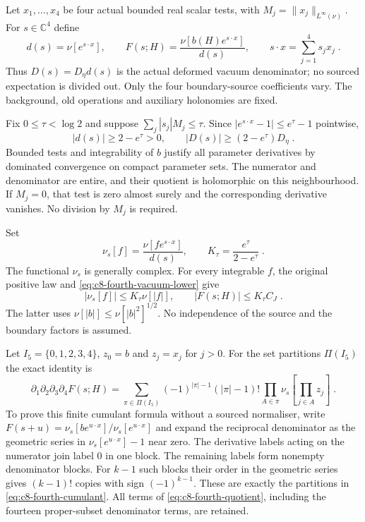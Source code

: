 \documentclass[11pt]{article}
\begin{document}
Let $x_1,\ldots,x_4$ be four actual bounded real scalar tests, with
$M_j=\|x_j\|_{L^\infty(\nu)}$. For $s\in\mathbb C^4$ define
\begin{equation}\label{eq:c8-fourth-tilt}
    d(s)=\nu[e^{s\cdot x}],\qquad
    F(s;H)=\frac{\nu[b(H)e^{s\cdot x}]}{d(s)},\qquad
    s\cdot x=\sum_{j=1}^{4}s_jx_j\;.
\end{equation}
Thus $D(s)=D_\eta d(s)$ is the actual deformed vacuum denominator;
no sourced expectation is divided out. Only the four boundary-source
coefficients vary. The background, old operations and auxiliary
holonomies are fixed.

Fix $0\leq\tau<\log2$ and suppose $\sum_j|s_j|M_j\leq\tau$.
Since $|e^{s\cdot x}-1|\leq e^\tau-1$ pointwise,
\begin{equation}\label{eq:c8-fourth-vacuum-lower}
    |d(s)|\geq2-e^\tau>0,\qquad
    |D(s)|\geq(2-e^\tau)D_\eta\;.
\end{equation}
Bounded tests and integrability of $b$ justify all parameter derivatives
by dominated convergence on compact parameter sets. The numerator and
denominator are entire, and their quotient is holomorphic on this
neighbourhood. If $M_j=0$, that test is zero almost surely and the
corresponding derivative vanishes. No division by $M_j$ is required.

Set
\begin{equation}\label{eq:c8-fourth-tilted-functional}
    \nu_s[f]=\frac{\nu[fe^{s\cdot x}]}{d(s)},\qquad
    K_\tau=\frac{e^\tau}{2-e^\tau}\;.
\end{equation}
The functional $\nu_s$ is generally complex. For every integrable $f$,
the original positive law and \eqref{eq:c8-fourth-vacuum-lower} give
\begin{equation}\label{eq:c8-fourth-tilt-domination}
    |\nu_s[f]|\leq K_\tau\nu[|f|],\qquad
    |F(s;H)|\leq K_\tau C_J\;.
\end{equation}
The latter uses $\nu[|b|]\leq\nu[|b|^2]^{1/2}$. No independence
of the source and the boundary factors is assumed.

Let $I_5=\{0,1,2,3,4\}$, $z_0=b$ and $z_j=x_j$ for $j>0$.
For the set partitions $\Pi(I_5)$ the exact identity is
\begin{equation}\label{eq:c8-fourth-cumulant}
    \partial_1\partial_2\partial_3\partial_4F(s;H)
        =\sum_{\pi\in\Pi(I_5)}(-1)^{|\pi|-1}(|\pi|-1)!
            \prod_{A\in\pi}\nu_s\left[\prod_{j\in A}z_j\right]\;.
\end{equation}
To prove this finite cumulant formula without a sourced normaliser,
write $F(s+u)=\nu_s[be^{u\cdot x}]/\nu_s[e^{u\cdot x}]$ and expand
the reciprocal denominator as the geometric series in
$\nu_s[e^{u\cdot x}]-1$ near zero. The derivative labels acting on
the numerator join label $0$ in one block. The remaining labels form
nonempty denominator blocks. For $k-1$ such blocks their order in the
geometric series gives $(k-1)!$ copies with sign $(-1)^{k-1}$.
These are exactly the partitions in \eqref{eq:c8-fourth-cumulant}.
All terms of \eqref{eq:c8-fourth-quotient}, including the fourteen
proper-subset denominator terms, are retained.
\end{document}
